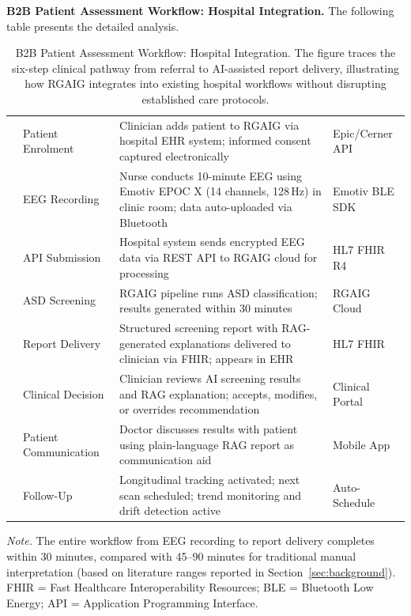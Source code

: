 \noindent\textbf{B2B Patient Assessment Workflow: Hospital Integration.} The following table presents the detailed analysis.

\begin{table}[!htbp]
\tablestripes\tablefontsize
\tablefontsize
\caption[B2B Patient Assessment Workflow: Hospital Integration]{B2B Patient Assessment Workflow: Hospital Integration. The figure traces the six-step clinical pathway from referral to AI-assisted report delivery, illustrating how RGAIG integrates into existing hospital workflows without disrupting established care protocols.}
\begin{tabularx}{\textwidth}{@{} >{\raggedright\arraybackslash}p{0.6cm} >{\raggedright\arraybackslash}p{3.0cm} L >{\raggedright\arraybackslash}p{2.5cm} @{}}
\toprule
\thead{\#} &  &  &  \\
 & Patient Enrolment & Clinician adds patient to RGAIG via hospital EHR system; informed consent captured electronically & Epic/Cerner API \\
 & EEG Recording & Nurse conducts 10-minute EEG using Emotiv EPOC X (14 channels, 128\,Hz) in clinic room; data auto-uploaded via Bluetooth & Emotiv BLE SDK \\
 & API Submission & Hospital system sends encrypted EEG data via REST API to RGAIG cloud for processing & HL7 FHIR R4 \\
 & ASD Screening & RGAIG pipeline runs ASD classification; results generated within 30 minutes & RGAIG Cloud \\
 & Report Delivery & Structured screening report with RAG-generated explanations delivered to clinician via FHIR; appears in EHR & HL7 FHIR \\
 & Clinical Decision & Clinician reviews AI screening results and RAG explanation; accepts, modifies, or overrides recommendation & Clinical Portal \\
 & Patient Communication & Doctor discusses results with patient using plain-language RAG report as communication aid & Mobile App \\
 & Follow-Up & Longitudinal tracking activated; next scan scheduled; trend monitoring and drift detection active & Auto-Schedule \\
\bottomrule
\end{tabularx}
\vspace{0.5em}
\noindent\textit{Note.} The entire workflow from EEG recording to report delivery completes within 30 minutes, compared with 45--90 minutes for traditional manual interpretation (based on literature ranges reported in Section~\ref{sec:background}). FHIR = Fast Healthcare Interoperability Resources; BLE = Bluetooth Low Energy; API = Application Programming Interface.
\end{table}
\fi




